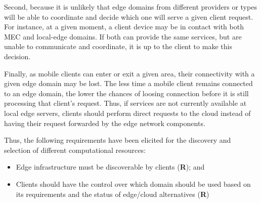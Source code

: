 Second, because it is unlikely that edge domains from different providers or types will be able to coordinate and decide which one will serve a given client request. For instance, at a given moment, a client device may be in contact with both MEC and local-edge domains. If both can provide the same services, but are unable to communicate and coordinate, it is up to the client to make this decision.





Finally, as mobile clients can enter or exit a given area, their connectivity with a given edge domain may be lost. The less time a mobile client remains connected to an edge domain, the lower the chances of loosing connection before it is still processing that client's request. Thus, if services are not currently available at local edge servers, clients should perform direct requests to the cloud instead of having their request forwarded by the edge network components. 


Thus, the following requirements have been elicited for the discovery and selection of different computational resources:


\begin{itemize}

	\item Edge infrastructure must be discoverable by clients (\textbf{R}); and

	\item Clients should have the control over which domain should be used based on its requirements and the status of edge/cloud alternatives (\textbf{R})

\end{itemize}

